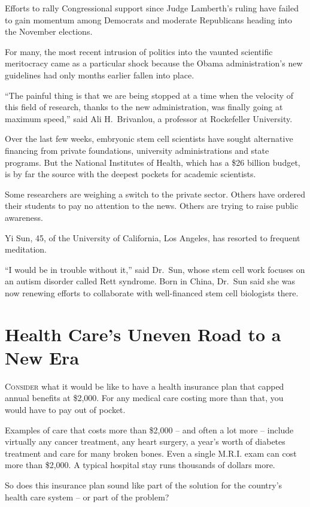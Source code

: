 ﻿\documentclass[12pt]{article}
\begin{document}
Efforts to rally Congressional support since Judge Lamberth's ruling have failed to gain momentum
among Democrats and moderate Republicans heading into the November elections.

For many, the most recent intrusion of politics into the vaunted scientific meritocracy came as a
particular shock because the Obama administration's new guidelines had only months earlier fallen
into place.

``The painful thing is that we are being stopped at a time when the velocity of this field of
research, thanks to the new administration, was finally going at maximum speed,'' said Ali
H.~Brivanlou, a professor at Rockefeller University.

Over the last few weeks, embryonic stem cell scientists have sought alternative financing from
private foundations, university administrations and state programs. But the National Institutes of
Health, which has a \$26 billion budget, is by far the source with the deepest pockets for academic
scientists.

Some researchers are weighing a switch to the private sector. Others have ordered their students to
pay no attention to the news. Others are trying to raise public awareness.

Yi Sun, 45, of the University of California, Los Angeles, has resorted to frequent meditation.

``I would be in trouble without it,'' said Dr.~Sun, whose stem cell work focuses on an autism
disorder called Rett syndrome. Born in China, Dr.~Sun said she was now renewing efforts to
collaborate with well-financed stem cell biologists there.

\section{Health Care's Uneven Road to a New Era}

\lettrine{C}{onsider} what it would be like to have a health insurance plan
that capped annual benefits at \$2,000. For any medical care costing more than that, you would have
to pay out of pocket.

Examples of care that costs more than \$2,000 -- and often a lot more -- include virtually any
cancer treatment, any heart surgery, a year's worth of diabetes treatment and care for many broken
bones. Even a single M.R.I. exam can cost more than \$2,000. A typical hospital stay runs thousands
of dollars more.

So does this insurance plan sound like part of the solution for the country's health care system --
or part of the problem?
\end{document}
